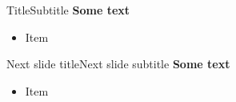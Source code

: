 \begin{frame}{Title}{Subtitle}
	 \textbf{Some text}
	 \begin{itemize}
	 	\item Item
	 \end{itemize}
\end{frame}


\begin{frame}{Next slide title}{Next slide subtitle}
	 \textbf{Some text}
	\begin{itemize}
		\item Item
	\end{itemize}
\end{frame}

